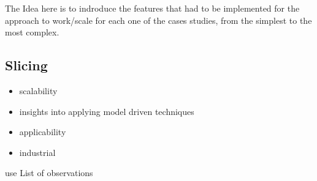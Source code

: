 The Idea here is to indroduce the features that had to be implemented for the
approach to work/scale for each one of the cases studies, from the simplest to
the most complex.
\subsection{Slicing}

\begin{itemize}
\item scalability
\item insights into applying model driven techniques
\item applicability
\item industrial
\end{itemize}
use List of observations\\

